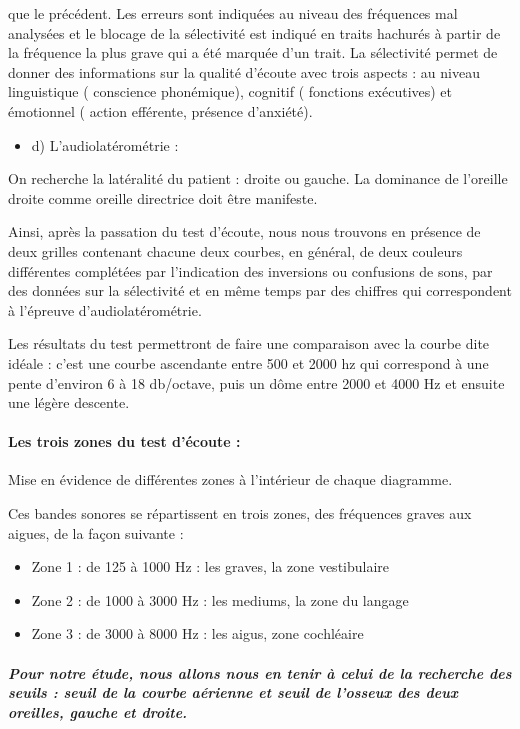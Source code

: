 que le précédent. Les erreurs sont indiquées au niveau des fréquences
mal analysées et le blocage de la sélectivité est indiqué en traits
hachurés à partir de la fréquence la plus grave qui a été marquée
d'un trait. La sélectivité permet de donner des informations sur la
qualité d'écoute avec trois aspects : au niveau linguistique ( conscience
phonémique), cognitif ( fonctions exécutives) et émotionnel ( action
efférente, présence d'anxiété).
\begin{itemize}
\item d) L'audiolatérométrie : 
\end{itemize}
On recherche la latéralité du patient : droite ou gauche. La dominance
de l'oreille droite comme oreille directrice doit être manifeste.

Ainsi, après la passation du test d\textquoteright écoute, nous nous
trouvons en présence de deux grilles contenant chacune deux courbes,
en général, de deux couleurs différentes complétées par l'indication
des inversions ou confusions de sons, par des données sur la sélectivité
et en même temps par des chiffres qui correspondent à l'épreuve d'audiolatérométrie.

Les résultats du test permettront de faire une comparaison avec la
courbe dite idéale : c'est une courbe ascendante entre 500 et 2000
hz qui correspond à une pente d\textquoteright environ 6 à 18 db/octave,
puis un dôme entre 2000 et 4000 Hz et ensuite une légère descente. 

\paragraph{Les trois zones du test d'écoute : }

Mise en évidence de différentes zones à l\textquoteright intérieur
de chaque diagramme. 

Ces bandes sonores se répartissent en trois zones, des fréquences
graves aux aigues, de la façon suivante :
\begin{itemize}
\item Zone 1 : de 125 à 1000 Hz : les graves, la zone vestibulaire
\item Zone 2 : de 1000 à 3000 Hz : les mediums, la zone du langage
\item Zone 3 : de 3000 à 8000 Hz : les aigus, zone cochléaire
\end{itemize}

\subparagraph*{Pour notre étude, nous allons nous en tenir à celui de la recherche
des seuils : seuil de la courbe aérienne et seuil de l'osseux des
deux oreilles, gauche et droite.}



